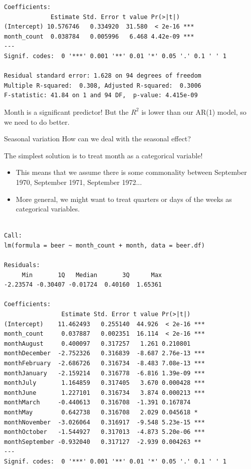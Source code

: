 \documentclass{beamer}\usepackage[]{graphicx}\usepackage[]{color}
\makeatletter
\newenvironment{kframe}{%
 \def\at@end@of@kframe{}%
 \ifinner\ifhmode%
  \def\at@end@of@kframe{\end{minipage}}%
  \begin{minipage}{\columnwidth}%
 \fi\fi%
 \def\FrameCommand##1{\hskip\@totalleftmargin \hskip-\fboxsep
 \colorbox{shadecolor}{##1}\hskip-\fboxsep
     \hskip-\linewidth \hskip-\@totalleftmargin \hskip\columnwidth}%
 \MakeFramed {\advance\hsize-\width
   \@totalleftmargin\z@ \linewidth\hsize
   \@setminipage}}%
 {\par\unskip\endMakeFramed%
 \at@end@of@kframe}
\newenvironment{knitrout}{}{} %
\makeatother
\begin{document}
\begin{darkframes}
\begin{frame}[fragile]
\begin{knitrout}
\begin{kframe}
\begin{verbatim}
Coefficients:
             Estimate Std. Error t value Pr(>|t|)    
(Intercept) 10.576746   0.334920  31.580  < 2e-16 ***
month_count  0.038784   0.005996   6.468 4.42e-09 ***
---
Signif. codes:  0 '***' 0.001 '**' 0.01 '*' 0.05 '.' 0.1 ' ' 1

Residual standard error: 1.628 on 94 degrees of freedom
Multiple R-squared:  0.308,	Adjusted R-squared:  0.3006 
F-statistic: 41.84 on 1 and 94 DF,  p-value: 4.415e-09
\end{verbatim}
\end{kframe}
\end{knitrout}
      \pause
      Month is a significant predictor! But the $R^2$ is lower than our AR(1) model, so we need to do better.
\end{frame}


\begin{frame}{Seasonal variation}
How can we deal with the seasonal effect?
\pause
\bigskip

The simplest solution is to treat month as a categorical variable!
\begin{itemize}
\item This means that we assume there is some commonality between September 1970, September 1971, September 1972...
\item More general, we might want to treat quarters or days of the weeks as categorical variables.
\end{itemize}
\end{frame}

\begin{frame}[fragile]%
    \fontsize{7}{7}\selectfont

\begin{knitrout}
\begin{kframe}
\begin{verbatim}

Call:
lm(formula = beer ~ month_count + month, data = beer.df)

Residuals:
     Min       1Q   Median       3Q      Max 
-2.23574 -0.30407 -0.01724  0.40160  1.65361 

Coefficients:
                Estimate Std. Error t value Pr(>|t|)    
(Intercept)    11.462493   0.255140  44.926  < 2e-16 ***
month_count     0.037887   0.002351  16.114  < 2e-16 ***
monthAugust     0.400097   0.317257   1.261 0.210801    
monthDecember  -2.752326   0.316839  -8.687 2.76e-13 ***
monthFebruary  -2.686726   0.316734  -8.483 7.08e-13 ***
monthJanuary   -2.159214   0.316778  -6.816 1.39e-09 ***
monthJuly       1.164859   0.317405   3.670 0.000428 ***
monthJune       1.227101   0.316734   3.874 0.000213 ***
monthMarch     -0.440613   0.316708  -1.391 0.167874    
monthMay        0.642738   0.316708   2.029 0.045618 *  
monthNovember  -3.026064   0.316917  -9.548 5.23e-15 ***
monthOctober   -1.544927   0.317013  -4.873 5.20e-06 ***
monthSeptember -0.932040   0.317127  -2.939 0.004263 ** 
---
Signif. codes:  0 '***' 0.001 '**' 0.01 '*' 0.05 '.' 0.1 ' ' 1


\end{verbatim}
\end{kframe}
\end{knitrout}
\end{frame}
\end{darkframes}
\end{document}
